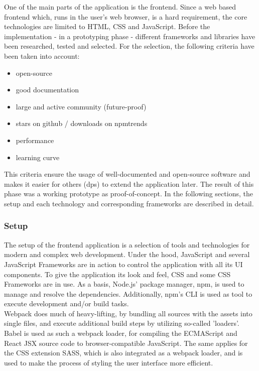 \documentclass[a4paper,11pt,pdftex,halfparskip,cleardoubleempty]{scrbook}
\begin{document}
One of the main parts of the application is the frontend. Since a web based frontend which, runs in the user's web browser, is a hard requirement, the core technologies are limited to HTML, CSS and JavaScript. Before the implementation - in a prototyping phase - different frameworks and libraries have been researched, tested and selected. For the selection, the following criteria have been taken into account:
\begin{itemize}
	\item open-source
	\item good documentation
	\item large and active community (future-proof)
	\item stars on github / downloads on npmtrends
	\item performance
	\item learning curve
\end{itemize}
This criteria ensure the usage of well-documented and open-source software and makes it easier for others (dps) to extend the application later.
The result of this phase was a working prototype as proof-of-concept.
In the following sections, the setup and each technology and corresponding frameworks are described in detail.


\subsubsection{Setup}

The setup of the frontend application is a selection of tools and technologies for modern and complex web development.
Under the hood, JavaScript and several JavaScript Frameworks are in action to control the application with all its UI components. To give the application its look and feel, CSS and some CSS Frameworks are in use.
As a basis, Node.js' package manager, npm, is used to manage and resolve the dependencies. Additionally, npm's CLI is used as tool to execute development and/or build tasks. \\
Webpack does much of heavy-lifting, by bundling all sources with the assets into single files, and execute additional build steps by utilizing so-called 'loaders'.
Babel is used as such a webpack loader, for compiling the ECMAScript and React JSX source code to browser-compatible JavaScript.
The same applies for the CSS extension SASS, which is also integrated as a webpack loader, and is used to make the process of styling the user interface more efficient.
\end{document}
